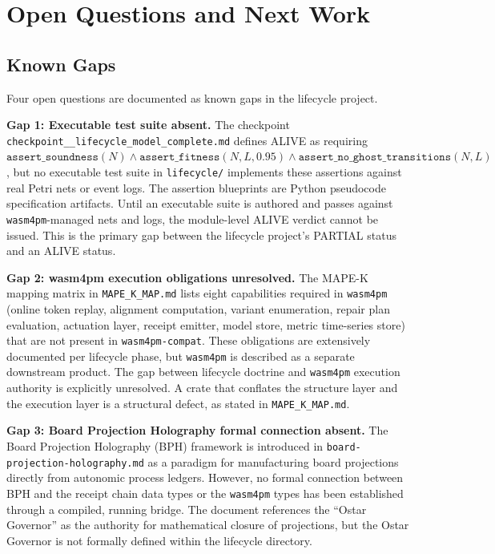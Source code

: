 
\section{Open Questions and Next Work}
\label{sec:lifecycle-open}

\subsection{Known Gaps}
\label{sec:lifecycle-open-gaps}

Four open questions are documented as known gaps in the lifecycle project.

\textbf{Gap 1: Executable test suite absent.} The checkpoint
\texttt{checkpoint\_\_lifecycle\_model\_complete.md} defines ALIVE as requiring
$\texttt{assert\_soundness}(N) \land \texttt{assert\_fitness}(N, L, 0.95) \land
\texttt{assert\_no\_ghost\_transitions}(N, L)$, but no executable test suite in
\texttt{lifecycle/} implements these assertions against real Petri nets or event logs.
The assertion blueprints are Python pseudocode specification artifacts. Until an
executable suite is authored and passes against \texttt{wasm4pm}-managed nets and
logs, the module-level ALIVE verdict cannot be issued. This is the primary gap between
the lifecycle project's PARTIAL status and an ALIVE status.

\textbf{Gap 2: wasm4pm execution obligations unresolved.} The MAPE-K mapping matrix
in \texttt{MAPE\_K\_MAP.md} lists eight capabilities required in \texttt{wasm4pm}
(online token replay, alignment computation, variant enumeration, repair plan evaluation,
actuation layer, receipt emitter, model store, metric time-series store) that are not
present in \texttt{wasm4pm-compat}. These obligations are extensively documented per
lifecycle phase, but \texttt{wasm4pm} is described as a separate downstream product.
The gap between lifecycle doctrine and \texttt{wasm4pm} execution authority is
explicitly unresolved. A crate that conflates the structure layer and the execution
layer is a structural defect, as stated in \texttt{MAPE\_K\_MAP.md}.

\textbf{Gap 3: Board Projection Holography formal connection absent.} The Board
Projection Holography (BPH) framework is introduced in
\texttt{board-projection-holography.md} as a paradigm for manufacturing board
projections directly from autonomic process ledgers. However, no formal connection
between BPH and the receipt chain data types or the \texttt{wasm4pm} types has been
established through a compiled, running bridge. The document references the
``Ostar Governor'' as the authority for mathematical closure of projections, but
the Ostar Governor is not formally defined within the lifecycle directory.

